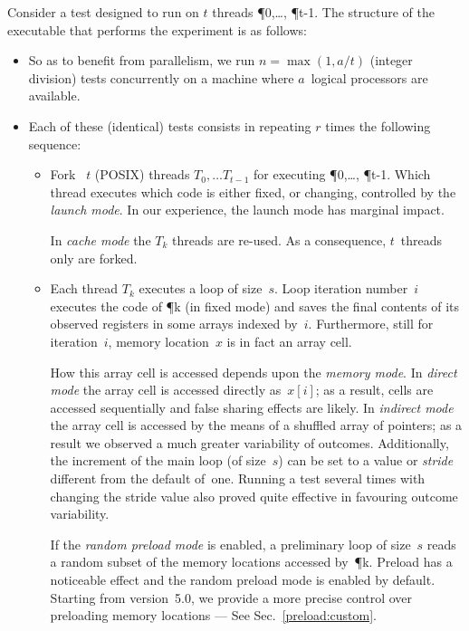 Consider a test 
designed to run on $t$ threads \P{0},\ldots, \P{t-1}.
The structure of the executable  that performs
the experiment is as follows:
\begin{itemize}
\item \label{defn}\label{defa}So as to benefit from parallelism,
we run $n = \max(1,a/t)$ (integer division)
tests concurrently on a machine where $a$~logical processors are available.
\item \label{defr}Each of these (identical)
tests consists in repeating $r$ times
the following sequence:
\begin{itemize}
\item Fork ~$t$ (POSIX) threads $T_0,\ldots T_{t-1}$
for executing \P{0},\ldots, \P{t-1}.
Which thread executes which code is either fixed, or changing,
controlled by the \emph{launch mode}.
In our experience, the launch mode has marginal impact.

In \emph{cache mode} the $T_k$ threads are re-used.
As a consequence, $t$~threads only are forked.

\item \label{defs}Each thread $T_k$ executes a loop of size~$s$.
Loop iteration number~$i$ executes the code of \P{k} (in fixed mode)
and saves
the final contents of its observed registers in some arrays indexed by~$i$.
Furthermore, still for iteration~$i$, memory location~$x$ is in fact
an array cell.

\label{defmemorymode}\label{defstride}How this array cell is accessed depends
upon the \emph{memory mode}.
In \emph{direct mode} the array cell is accessed directly as~$x[i]$;
as a result, cells are accessed sequentially and false sharing effects
are likely.
In \emph{indirect mode} the array cell is accessed by the means of a
shuffled array of pointers;
as a result we observed a much greater variability of outcomes.
Additionally, the increment of the main loop (of size~$s$)
can be set to a value or \emph{stride} different from the default of~one.
Running a test several times with changing the stride value also
proved quite effective in favouring outcome variability.



\label{defpreload}If the \emph{random preload mode} is enabled,
a preliminary loop of size~$s$ reads
a random subset of the memory locations accessed by~\P{k}.
Preload has a noticeable effect and the random preload mode is
enabled by default.
Starting from version~5.0, we provide a more precise control
over preloading memory locations --- See Sec.~\ref{preload:custom}.



\end{itemize}
\end{itemize}
